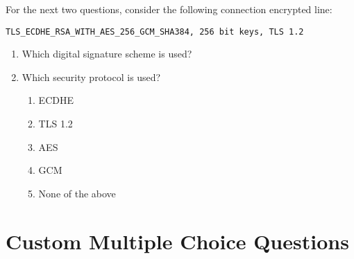 \documentclass[12pt]{article}
\providecommand{\tightlist}{%
  \setlength{\itemsep}{0pt}\setlength{\parskip}{0pt}}
\begin{document}
For the next two questions, consider the following connection encrypted
line:

\begin{center}
\lstinline{TLS_ECDHE_RSA_WITH_AES_256_GCM_SHA384, 256 bit keys, TLS 1.2}
\end{center}

\begin{enumerate}
\def\labelenumi{\arabic{enumi}.}
\setcounter{enumi}{8}
\tightlist
\item
  Which digital signature scheme is used?

\item
  Which security protocol is used?

  \begin{enumerate}
  \def\labelenumii{(\alph{enumii})}
  \tightlist
  \item
    ECDHE
  \item
    TLS 1.2
  \item
    AES
  \item
    GCM
  \item
    None of the above
  \end{enumerate}
\end{enumerate}

\hypertarget{custom-multiple-choice-questions}{%
\section{Custom Multiple Choice
Questions}\label{custom-multiple-choice-questions}}
\end{document}
